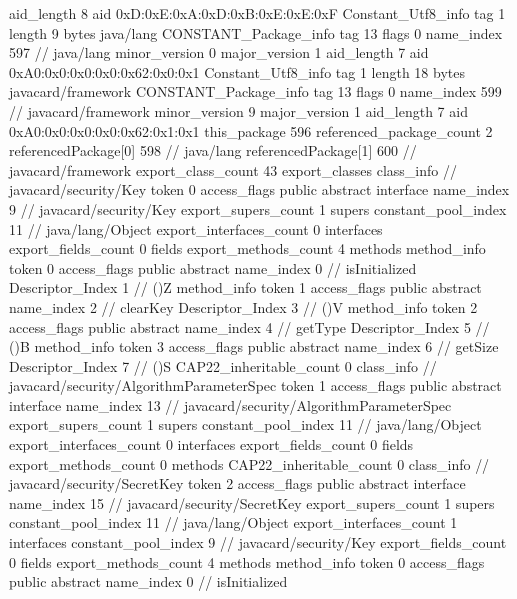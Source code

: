 {{{			aid_length	8
			aid	0xD:0xE:0xA:0xD:0xB:0xE:0xE:0xF
		}
		Constant_Utf8_info {
			tag	1
			length	9
			bytes	java/lang
		}
		CONSTANT_Package_info {
			tag	13
			flags	0
			name_index	597		// java/lang
			minor_version	0
			major_version	1
			aid_length	7
			aid	0xA0:0x0:0x0:0x0:0x62:0x0:0x1
		}
		Constant_Utf8_info {
			tag	1
			length	18
			bytes	javacard/framework
		}
		CONSTANT_Package_info {
			tag	13
			flags	0
			name_index	599		// javacard/framework
			minor_version	9
			major_version	1
			aid_length	7
			aid	0xA0:0x0:0x0:0x0:0x62:0x1:0x1
		}
	}
	this_package	596
	referenced_package_count	2
	referencedPackage[0]	598		// java/lang
	referencedPackage[1]	600		// javacard/framework
	export_class_count	43
	export_classes {
		class_info {		// javacard/security/Key
			token	0
			access_flags	public abstract interface
			name_index	9		// javacard/security/Key
			export_supers_count	1
			supers {
				constant_pool_index	11		// java/lang/Object
			}
			export_interfaces_count	0
			interfaces {
			}
			export_fields_count	0
			fields {
			}
			export_methods_count	4
			methods {
				method_info {
					token	0
					access_flags	public abstract
					name_index	0		// isInitialized
					Descriptor_Index	1		// ()Z
				}
				method_info {
					token	1
					access_flags	public abstract
					name_index	2		// clearKey
					Descriptor_Index	3		// ()V
				}
				method_info {
					token	2
					access_flags	public abstract
					name_index	4		// getType
					Descriptor_Index	5		// ()B
				}
				method_info {
					token	3
					access_flags	public abstract
					name_index	6		// getSize
					Descriptor_Index	7		// ()S
				}
			}
			CAP22_inheritable_count	0
		}
		class_info {		// javacard/security/AlgorithmParameterSpec
			token	1
			access_flags	public abstract interface
			name_index	13		// javacard/security/AlgorithmParameterSpec
			export_supers_count	1
			supers {
				constant_pool_index	11		// java/lang/Object
			}
			export_interfaces_count	0
			interfaces {
			}
			export_fields_count	0
			fields {
			}
			export_methods_count	0
			methods {
			}
			CAP22_inheritable_count	0
		}
		class_info {		// javacard/security/SecretKey
			token	2
			access_flags	public abstract interface
			name_index	15		// javacard/security/SecretKey
			export_supers_count	1
			supers {
				constant_pool_index	11		// java/lang/Object
			}
			export_interfaces_count	1
			interfaces {
				constant_pool_index	9		// javacard/security/Key
			}
			export_fields_count	0
			fields {
			}
			export_methods_count	4
			methods {
				method_info {
					token	0
					access_flags	public abstract
					name_index	0		// isInitialized
}}}}}
